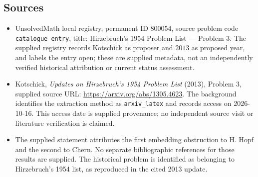 \documentclass[11pt]{article}
\begin{document}
\subsection{Sources}
\begin{itemize}
\item UnsolvedMath local registry, permanent ID \(800054\), source problem code \texttt{catalogue entry}, title: Hirzebruch's 1954 Problem List --- Problem 3. The supplied registry records Kotschick as proposer and \(2013\) as proposed year, and labels the entry open; these are supplied metadata, not an independently verified historical attribution or current status assessment.
\item Kotschick, \emph{Updates on Hirzebruch's 1954 Problem List} (2013), Problem 3, supplied source URL: \url{https://arxiv.org/abs/1305.4623}. The background identifies the extraction method as \texttt{arxiv\_latex} and records access on 2026-10-16. This access date is supplied provenance; no independent source visit or literature verification is claimed.
\item The supplied statement attributes the first embedding obstruction to H. Hopf and the second to Chern. No separate bibliographic references for those results are supplied. The historical problem is identified as belonging to Hirzebruch's 1954 list, as reproduced in the cited 2013 update.
\end{itemize}
\end{document}
